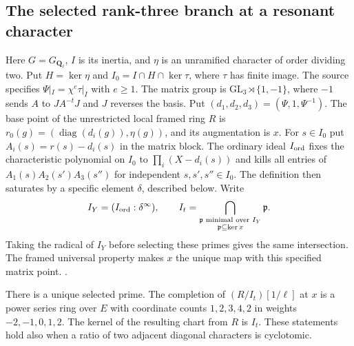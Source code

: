 \subsection{The selected rank-three branch at a resonant character}
\label{dp:ordinary3}

Here \(G=G_{\mathbf Q_\ell}\), \(I\) is its inertia, and \(\eta\)
is an unramified character of order dividing two. Put \(H=\ker\eta\)
and \(I_0=I\cap H\cap\ker\tau\), where \(\tau\) has finite image.
The source specifies \(\Psi|_I=\chi^e\tau|_I\) with \(e\ge1\).
The matrix group is \(\mathrm{GL}_3\rtimes\{1,-1\}\), where
\(-1\) sends \(A\) to \(J A^{-t}J\) and \(J\) reverses the basis.
Put \((d_1,d_2,d_3)=(\Psi,1,\Psi^{-1})\). The base point of
the unrestricted local framed ring \(R\) is
\(r_0(g)=(\operatorname{diag}(d_i(g)),\eta(g))\), and its
augmentation is \(x\). For \(s\in I_0\) put \(A_i(s)=r(s)-d_i(s)\)
in the matrix block. The ordinary ideal \(I_{\rm ord}\) fixes the
characteristic polynomial on \(I_0\) to \(\prod_i(X-d_i(s))\)
and kills all entries of \(A_1(s)A_2(s')A_3(s'')\) for independent
\(s,s',s''\in I_0\). The definition then saturates by a specific
element \(\delta\), described below. Write
\[
 I_Y=(I_{\rm ord}:\delta^\infty),\qquad
 I_t=\bigcap_{\substack{\mathfrak p\text{ minimal over }I_Y\\
                          \mathfrak p\subseteq\ker x}}\mathfrak p .
\]
Taking the radical of \(I_Y\) before selecting these primes gives
the same intersection. The framed universal property makes \(x\)
the unique map with this specified matrix point.
.

\begin{proposition}\label{dp:rank3chart}
There is a unique selected prime. The completion of
\((R/I_t)[1/\ell]\) at \(x\) is a power series ring over \(E\)
with coordinate counts \(1,2,3,4,2\) in weights \(-2,-1,0,1,2\).
The kernel of the resulting chart from \(R\) is \(I_t\).
These statements hold also when a ratio of two adjacent diagonal
characters is cyclotomic.
\end{proposition}

